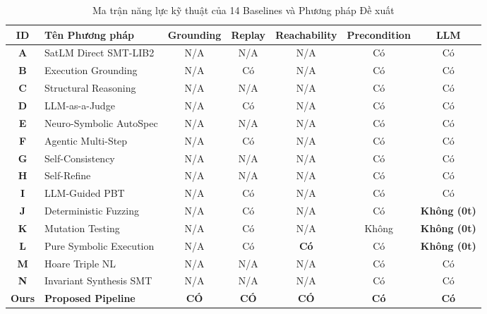 \begin{table}[H]
\centering
\small
\renewcommand{\arraystretch}{1.2}
\begin{tabular}{|c|l|c|c|c|c|c|}
\hline
\textbf{ID} & \textbf{Tên Phương pháp} & \textbf{Grounding} & \textbf{Replay} & \textbf{Reachability} & \textbf{Precondition} & \textbf{LLM} \\
\hline
\textbf{A} & SatLM Direct SMT-LIB2 & N/A & N/A & N/A & Có & Có \\
\hline
\textbf{B} & Execution Grounding & N/A & Có & N/A & Có & Có \\
\hline
\textbf{C} & Structural Reasoning & N/A & N/A & N/A & Có & Có \\
\hline
\textbf{D} & LLM-as-a-Judge & N/A & Có & N/A & Có & Có \\
\hline
\textbf{E} & Neuro-Symbolic AutoSpec & N/A & N/A & N/A & Có & Có \\
\hline
\textbf{F} & Agentic Multi-Step & N/A & Có & N/A & Có & Có \\
\hline
\textbf{G} & Self-Consistency & N/A & N/A & N/A & Có & Có \\
\hline
\textbf{H} & Self-Refine & N/A & N/A & N/A & Có & Có \\
\hline
\textbf{I} & LLM-Guided PBT & N/A & Có & N/A & Có & Có \\
\hline
\textbf{J} & Deterministic Fuzzing & N/A & Có & N/A & Có & \textbf{Không (0t)} \\
\hline
\textbf{K} & Mutation Testing & N/A & Có & N/A & Không & \textbf{Không (0t)} \\
\hline
\textbf{L} & Pure Symbolic Execution & N/A & Có & \textbf{Có} & Có & \textbf{Không (0t)} \\
\hline
\textbf{M} & Hoare Triple NL & N/A & N/A & N/A & Có & Có \\
\hline
\textbf{N} & Invariant Synthesis SMT & N/A & N/A & N/A & Có & Có \\
\hline
\hline
\textbf{Ours} & \textbf{Proposed Pipeline} & \textbf{CÓ} & \textbf{CÓ} & \textbf{CÓ} & \textbf{Có} & \textbf{Có} \\
\hline
\end{tabular}
\caption{Ma trận năng lực kỹ thuật của 14 Baselines và Phương pháp Đề xuất}
\label{tab:baselines_capability_matrix}
\end{table}

